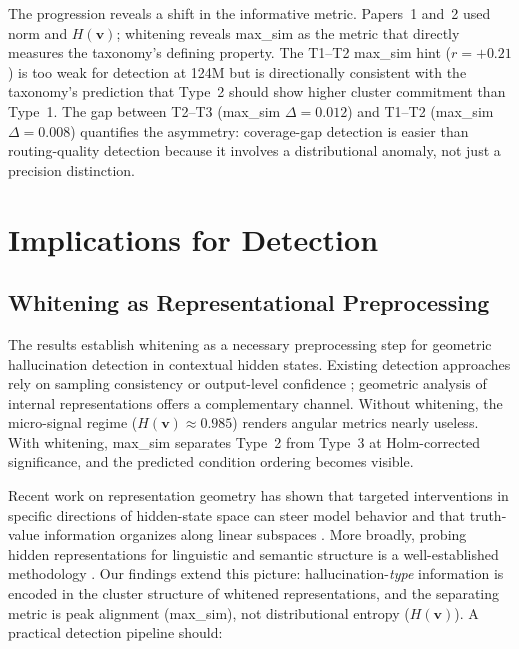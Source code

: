 \documentclass[11pt]{article}
\newcommand{\Hv}{H(\mathbf{v})}
\begin{document}
The progression reveals a shift in the informative metric. Papers~1 and~2 used norm and $\Hv$; whitening reveals max\_sim as the metric that directly measures the taxonomy's defining property. The T1--T2 max\_sim hint ($r = +0.21$) is too weak for detection at 124M but is directionally consistent with the taxonomy's prediction that Type~2 should show higher cluster commitment than Type~1. The gap between T2--T3 (max\_sim $\Delta = 0.012$) and T1--T2 (max\_sim $\Delta = 0.008$) quantifies the asymmetry: coverage-gap detection is easier than routing-quality detection because it involves a distributional anomaly, not just a precision distinction.


\section{Implications for Detection}

\subsection{Whitening as Representational Preprocessing}

The results establish whitening as a necessary preprocessing step for geometric hallucination detection in contextual hidden states. Existing detection approaches rely on sampling consistency \citep{manakul2023selfcheckgpt} or output-level confidence \citep{varshney2023stitch}; geometric analysis of internal representations offers a complementary channel. Without whitening, the micro-signal regime ($\Hv \approx 0.985$) renders angular metrics nearly useless. With whitening, max\_sim separates Type~2 from Type~3 at Holm-corrected significance, and the predicted condition ordering becomes visible.

Recent work on representation geometry has shown that targeted interventions in specific directions of hidden-state space can steer model behavior \citep{li2024inference} and that truth-value information organizes along linear subspaces \citep{marks2024geometry}. More broadly, probing hidden representations for linguistic and semantic structure is a well-established methodology \citep{belinkov2022probing, hewitt2019structural}. Our findings extend this picture: hallucination-\textit{type} information is encoded in the cluster structure of whitened representations, and the separating metric is peak alignment (max\_sim), not distributional entropy ($\Hv$). A practical detection pipeline should:
\end{document}

